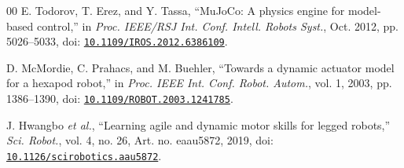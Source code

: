 \documentclass{ieeeaccess}
\begin{document}
\begin{thebibliography}{00}
E. Todorov, T. Erez, and Y. Tassa, \textquotedblleft{}MuJoCo: A physics engine for model-based control,\textquotedblright{} in \emph{Proc. IEEE/RSJ Int. Conf. Intell. Robots Syst.}, Oct. 2012, pp. 5026--5033, doi: \href{https://doi.org/10.1109/IROS.2012.6386109}{\nolinkurl{10.1109/IROS.2012.6386109}}.

D. McMordie, C. Prahacs, and M. Buehler, \textquotedblleft{}Towards a dynamic actuator model for a hexapod robot,\textquotedblright{} in \emph{Proc. IEEE Int. Conf. Robot. Autom.}, vol. 1, 2003, pp. 1386--1390, doi: \href{https://doi.org/10.1109/ROBOT.2003.1241785}{\nolinkurl{10.1109/ROBOT.2003.1241785}}.

J. Hwangbo \emph{et al.}, \textquotedblleft{}Learning agile and dynamic motor skills for legged robots,\textquotedblright{} \emph{Sci. Robot.}, vol. 4, no. 26, Art. no. eaau5872, 2019, doi: \href{https://doi.org/10.1126/scirobotics.aau5872}{\nolinkurl{10.1126/scirobotics.aau5872}}.\EOD
\end{thebibliography}
\end{document}
